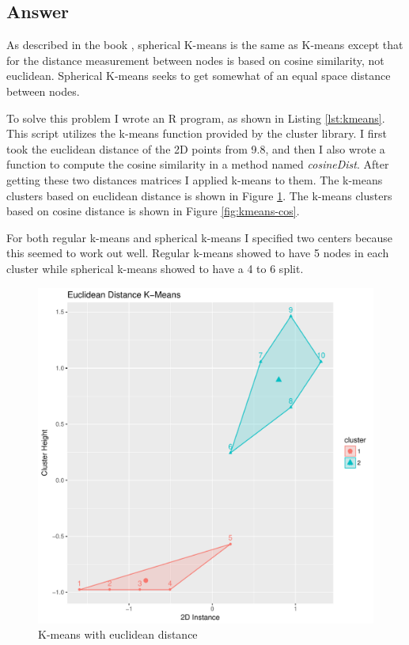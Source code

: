 \documentclass[letterpaper,11pt]{article}
\newcommand*{\srcPath}{../src}%
\begin{document}
\subsection*{Answer}

As described in the book \cite{book}, spherical K-means is the same as K-means except that for the distance measurement between nodes is based on cosine similarity, not euclidean.
Spherical K-means seeks to get somewhat of an equal space distance between nodes.

To solve this problem I wrote an R program, as shown in Listing \ref{lst:kmeans}. 
This script utilizes the k-means function provided by the cluster library.
I first took the euclidean distance of the 2D points from 9.8, and then I also wrote a function to compute the cosine similarity in a method named \textit{cosineDist}.
After getting these two distances matrices I applied k-means to them.
The k-means clusters based on euclidean distance is shown in Figure \ref{fig:kmeans-euc}.
The k-means clusters based on cosine distance is shown in Figure \ref{fig:kmeans-cos}.

For both regular k-means and spherical k-means I specified two centers because this seemed to work out well.
Regular k-means showed to have 5 nodes in each cluster while spherical k-means showed to have a 4 to 6 split.

 

\begin{figure}[h]
\centering
\includegraphics[scale=0.5]{kmeans-euc.pdf}
\caption{K-means with euclidean distance}
\label{fig:kmeans-euc}
\end{figure}
\end{document}
